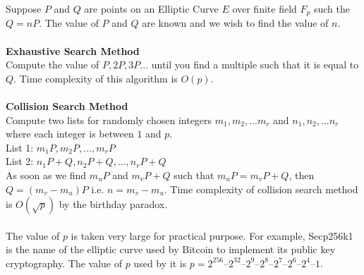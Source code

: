 \documentclass[a4paper,12pt]{report}
\begin{document}
Suppose  $P$ and $Q$ are points on an Elliptic Curve $E$ over finite field $F_p$ such the $Q=nP$. The value of $P$ and $Q$ are known and we wish to find the value of $n$.\\\\
\textbf{Exhaustive Search Method}\\
Compute the value of $P,2P,3P...$ until you find a multiple such that it is equal to $Q$. Time complexity of this algorithm is $O(p)$.\\\\
\textbf{Collision Search Method}\\
Compute two lists for randomly chosen integers $m_1, m_2, . . .m_r$ and $n_1, n_2, . . .n_r$ where each integer is between $1$ and $p$.\\
List 1: $m_1 P, m_2 P, . . .,m_r P$\\
List 2: $n_1 P + Q, n_2 P + Q, . . ., n_r P + Q$\\
As soon as we find $m_u P$ and $m_v P + Q$ such that $m_u P = m_v P + Q$, then $Q = (m_v - m_u) P $ i.e. $n=m_v - m_u$. Time complexity of collision search method is $O(\sqrt{p})$ by the birthday paradox\cite{hoffstein2008introduction}.\\\\
The value of $p$ is taken very large for practical purpose. For example, Secp256k1 is the name of the elliptic curve used by Bitcoin to implement its public key cryptography. The value of $p$ used by it is $p = 2^{256} – 2^{32} – 2^9 – 2^8 – 2^7 – 2^6 – 2^4 – 1$.
\cleardoublepage
\end{document}
